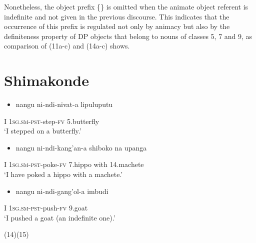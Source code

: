 \documentclass[output=paper]{langsci/langscibook}
\begin{document}
Nonetheless, the object prefix \{\} is omitted when the animate object referent is indefinite and not given in the previous discourse. This indicates that the occurrence of this prefix is regulated not only by animacy but also by the definiteness property of DP objects that belong to nouns of classes 5, 7 and 9, as comparison of (11a-c) and (14a-c) shows.

\chapter[Shimakonde]{Shimakonde}
\label{bkm:Ref455884706}\setcounter{itemize}{0}
\begin{itemize}
\item \gll nangu        ni-ndi-nivat-a                 lipuluputu\\
\end{itemize}
     I                \textsc{1sg.sm-pst}{}-step-\textsc{fv}        5.butterfly\\
\glt ‘I stepped on a butterfly.’
\z

\begin{itemize}
\item \gll nangu        ni-ndi-kang'an-a             shiboko           na       upanga\\
\end{itemize}
     I                \textsc{1sg.sm-pst}{}-poke-\textsc{fv}       7.hippo            with   14.machete\\
\glt ‘I have poked a hippo with a machete.’
\z

\begin{itemize}
\item \gll nangu        ni-ndi-gang'ol-a             imbudi\\
\end{itemize}
     I                \textsc{1sg.sm-pst}{}-push-\textsc{fv}       9.goat\\
\glt ‘I pushed a goat (an indefinite one).’
\z

(14)\textstyleFontepargpadroi{\}}\textstyleFontepargpadroi{\textit{ }}(15)
\end{document}
